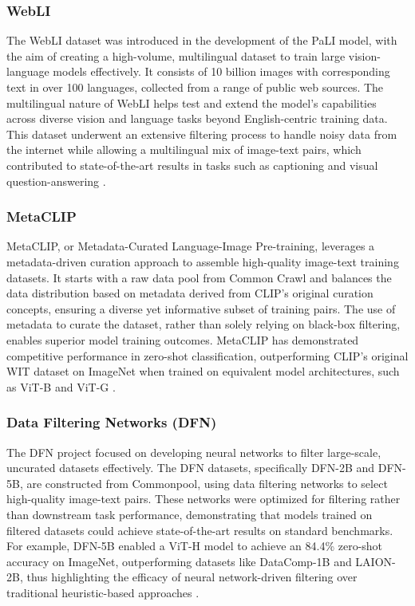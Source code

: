 \subsubsection{WebLI} The WebLI dataset was introduced in the development of the PaLI model, with the aim of creating a high-volume, multilingual dataset to train large vision-language models effectively. It consists of 10 billion images with corresponding text in over 100 languages, collected from a range of public web sources. The multilingual nature of WebLI helps test and extend the model’s capabilities across diverse vision and language tasks beyond English-centric training data. This dataset underwent an extensive filtering process to handle noisy data from the internet while allowing a multilingual mix of image-text pairs, which contributed to state-of-the-art results in tasks such as captioning and visual question-answering \cite{chen2022pali}.

\subsubsection{MetaCLIP} MetaCLIP, or Metadata-Curated Language-Image Pre-training, leverages a metadata-driven curation approach to assemble high-quality image-text training datasets. It starts with a raw data pool from Common Crawl and balances the data distribution based on metadata derived from CLIP’s original curation concepts, ensuring a diverse yet informative subset of training pairs. The use of metadata to curate the dataset, rather than solely relying on black-box filtering, enables superior model training outcomes. MetaCLIP has demonstrated competitive performance in zero-shot classification, outperforming CLIP's original WIT dataset on ImageNet when trained on equivalent model architectures, such as ViT-B and ViT-G \cite{xu2023demystifying}.

\subsubsection{Data Filtering Networks (DFN)} The DFN project focused on developing neural networks to filter large-scale, uncurated datasets effectively. The DFN datasets, specifically DFN-2B and DFN-5B, are constructed from Commonpool, using data filtering networks to select high-quality image-text pairs. These networks were optimized for filtering rather than downstream task performance, demonstrating that models trained on filtered datasets could achieve state-of-the-art results on standard benchmarks. For example, DFN-5B enabled a ViT-H model to achieve an 84.4\% zero-shot accuracy on ImageNet, outperforming datasets like DataComp-1B and LAION-2B, thus highlighting the efficacy of neural network-driven filtering over traditional heuristic-based approaches \cite{fang2023data}.

